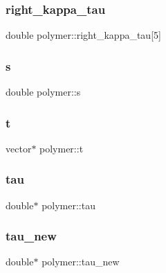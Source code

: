 \subsubsection{\texorpdfstring{right\+\_\+kappa\+\_\+tau}{right\_kappa\_tau}}
{\footnotesize\ttfamily double polymer\+::right\+\_\+kappa\+\_\+tau\mbox{[}5\mbox{]}}

\hypertarget{classpolymer_a10f77b05b8c1372afc359cccc3a231f9}{}\label{classpolymer_a10f77b05b8c1372afc359cccc3a231f9} 
\subsubsection{\texorpdfstring{s}{s}}
{\footnotesize\ttfamily double polymer\+::s}

\hypertarget{classpolymer_a601a9ddb7ed75e1057bccc90b4fef04f}{}\label{classpolymer_a601a9ddb7ed75e1057bccc90b4fef04f} 
\subsubsection{\texorpdfstring{t}{t}}
{\footnotesize\ttfamily vector$\ast$ polymer\+::t}

\hypertarget{classpolymer_a314dfc1f874c4ece78eae8e5910805c4}{}\label{classpolymer_a314dfc1f874c4ece78eae8e5910805c4} 
\subsubsection{\texorpdfstring{tau}{tau}}
{\footnotesize\ttfamily double$\ast$ polymer\+::tau}

\hypertarget{classpolymer_a861b0d4b1da6426c1da5a1f1cc3b7825}{}\label{classpolymer_a861b0d4b1da6426c1da5a1f1cc3b7825} 
\subsubsection{\texorpdfstring{tau\+\_\+new}{tau\_new}}
{\footnotesize\ttfamily double$\ast$ polymer\+::tau\+\_\+new}

\hypertarget{classpolymer_a0c341b176ce68b26ba1e44388f5ebcc3}{}\label{classpolymer_a0c341b176ce68b26ba1e44388f5ebcc3} 

